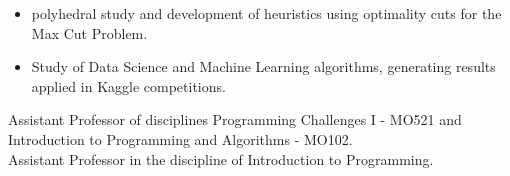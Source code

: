 \documentclass[10pt,a4paper,ragged2e,withhyper]{altacv}
\begin{document}
\begin{paracol}{2}
\begin{itemize}
        	\item polyhedral study and development of heuristics using optimality cuts for the Max Cut Problem.
        	\item Study of Data Science and Machine Learning algorithms, generating results applied in Kaggle competitions.
        \end{itemize}
        \medskip
        {Assistant Professor of disciplines Programming Challenges I - MO521 and
          Introduction to Programming and Algorithms - MO102. \\}
        \divider
        \medskip
        {Assistant Professor in the discipline of Introduction to Programming. \\}
        \divider
    \end{paracol}
    
\end{document}
